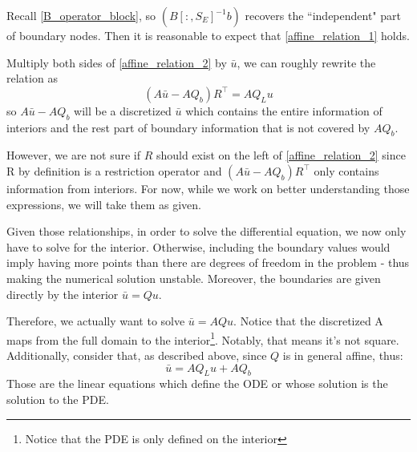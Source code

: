 \documentclass[11pt]{article}
\begin{document}
\begin{itemize}
		Recall \cref{B_operator_block}, so $\left(B[:,S_E]^{-1} b \right)$ recovers the ``independent" part of boundary nodes. Then it is reasonable to expect that \cref{affine_relation_1} holds.

	Multiply both sides of \cref{affine_relation_2} by $\bar{u}$, we can roughly rewrite the relation as
	\begin{equation}
	(A \bar{u}-A  Q_b)  R^{\top} = A  Q_L u
	\end{equation}
	so $A \bar{u}-A   Q_b$ will be a discretized $\bar{u}$ which contains the entire information of interiors and the rest part of boundary information that is not covered by $A  Q_b$.

	However, we are not sure if $R$ should exist on the left of \cref{affine_relation_2} since R by definition is a restriction operator and $(A  \bar{u}-A  Q_b) R^{\top}$ only contains information from interiors.
	For now, while we work on better understanding those expressions, we will take them as given.


	Given those relationships, in order to solve the differential equation, we now only have to solve for the interior. Otherwise, including the boundary values would imply having more points than there are degrees of freedom in the problem - thus making the numerical solution unstable. Moreover, the boundaries are given directly by the interior $\bar{u} = Q u$.

	Therefore, we actually want to solve $\bar{u} = A Q u$. Notice that the discretized A maps from the full domain to the interior\footnote{Notice that the PDE is only defined on the interior}. Notably, that means it's not square. Additionally, consider that, as described above, since $Q$ is in general affine, thus:
	\begin{equation}
	\bar{u} = A Q_L u + A Q_b
	\end{equation}
	Those are the linear equations which define the ODE or whose solution is the solution to the PDE.
\end{itemize}
\end{document}
